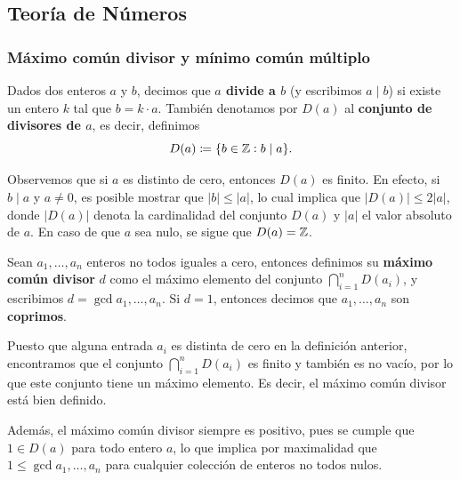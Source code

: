 \subsection{Teoría de Números}
\label{section:number-theory}
\subsubsection{Máximo común divisor y mínimo común múltiplo}
\noindent

\begin{definition}
	Dados dos enteros $a$ y $b$, decimos que \textbf{$a$ divide a $b$} (y escribimos $a \mid b$) si
	existe un entero $k$ tal que $b = k \cdot a$. También denotamos por $D(a)$ al \textbf{conjunto de
	divisores de $a$}, es decir, definimos
	\begin{equation*}
		D(a) \coloneq \lbrace b \in \mathbb{Z} \vcentcolon b \mid a \rbrace.
	\end{equation*}
\end{definition}
Observemos que si $a$ es distinto de cero, entonces $D(a)$ es finito. En efecto, si $b \mid a$ y $a
\neq 0$, es posible mostrar que $|b| \leq |a|$, lo cual implica que $|D(a)| \leq 2|a|$, donde
$|D(a)|$ denota la cardinalidad del conjunto $D(a)$ y $|a|$ el valor absoluto de $a$. En caso de que
$a$ sea nulo, se sigue que $D(a) = \mathbb{Z}$.

\begin{definition}
	\label{prerreq:def:gcd}
	Sean $a_1, \ldots, a_n$ enteros no todos iguales a cero, entonces definimos su \textbf{máximo
	común divisor} $d$ como el máximo elemento del conjunto $\bigcap_{i=1}^{n}D(a_i)$, y escribimos
	$d = \gcd{a_1, \ldots, a_n}$. Si $d = 1$, entonces decimos que $a_1, \ldots, a_n$ son
	\textbf{coprimos}.
\end{definition}
Puesto que alguna entrada $a_i$ es distinta de cero en la definición anterior, encontramos que el
conjunto $\bigcap_{i=1}^{n}D(a_i)$ es finito y también es no vacío, por lo que este conjunto tiene
un máximo elemento. Es decir, el máximo común divisor está bien definido.

Además, el máximo común divisor siempre es positivo, pues se cumple que $1 \in D(a)$ para todo
entero $a$, lo que implica por maximalidad que $1 \leq \gcd{a_1, \ldots, a_n}$ para cualquier
colección de enteros no todos nulos.

